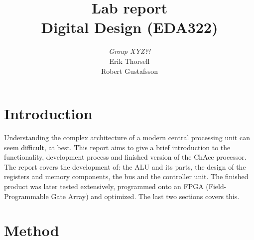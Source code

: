 \documentclass[a4paper,11pt]{article}
\begin{document}
\begin{titlepage}

\title{\Huge{Lab report} \\[0.1cm] \Large{Digital Design (EDA322)}}
\author{\large{\emph{Group XYZ?!}} \\[0.2cm] Erik Thorsell \\[0.05cm] Robert Gustafsson \\[0.1cm]}
\maketitle
\thispagestyle{empty}
\end{titlepage}
\clearpage
\pagestyle{fancyplain}
\tableofcontents
\clearpage
{}
\setcounter{page}{1}

\section{Introduction}
Understanding the complex architecture of a modern central processing unit can 
seem difficult, at best. This report aims to give a brief introduction to 
the functionality, development process and finished version of the ChAcc 
processor. The report covers the development of: the ALU and its parts, 
the design of the registers and memory components, the bus and the controller 
unit. The finished product was later tested extensively, programmed onto an 
FPGA (Field-Programmable Gate Array) and optimized. The last two sections 
covers this.

\section{Method}
\end{document}
